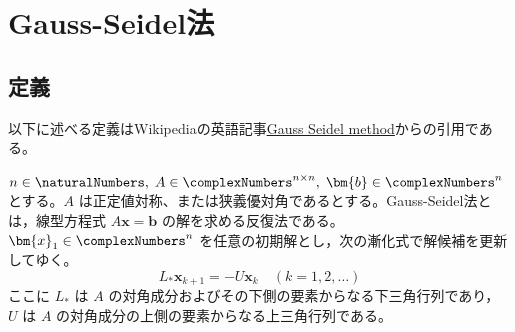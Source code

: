 \chapter{Gauss-Seidel法}
    \section{定義}
        以下に述べる定義はWikipediaの英語記事\href{https://en.wikipedia.org/wiki/Gauss%E2%80%93Seidel_method}{Gauss Seidel method}からの引用である。
        \par
        $n\in\naturalNumbers,\;A\in\complexNumbers^{n\times n},\;\bm{b}\in\complexNumbers^n$ とする。$A$ は正定値対称、または狭義優対角であるとする。Gauss-Seidel法とは，線型方程式 $A\bm{x}=\bm{b}$ の解を求める反復法である。$\bm{x}_1\in\complexNumbers^n$ を任意の初期解とし，次の漸化式で解候補を更新してゆく。
        \[ L_* \bm{x}_{k+1} = -U\bm{x}_k \quad (k=1,2,\dots)\]
        ここに $L_*$ は $A$ の対角成分およびその下側の要素からなる下三角行列であり， $U$ は $A$ の対角成分の上側の要素からなる上三角行列である。
